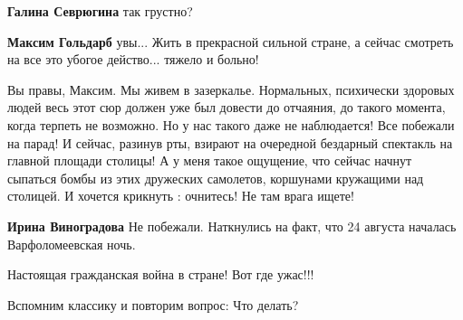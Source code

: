 \begin{itemize}
\begin{itemize}
\textbf{Галина Севрюгина} так грустно?

 
\textbf{Максим Гольдарб} увы... Жить в прекрасной сильной стране, а сейчас смотреть на все это убогое действо... тяжело и больно!
\end{itemize}

 

Вы правы, Максим. Мы живем в зазеркалье. Нормальных, психически здоровых людей
весь этот сюр должен уже был довести до отчаяния, до такого момента, когда
терпеть не возможно. Но у нас такого даже не наблюдается! Все побежали на
парад! И сейчас, разинув рты, взирают на очередной бездарный спектакль на
главной площади столицы! А у меня такое ощущение, что сейчас начнут сыпаться
бомбы из этих дружеских самолетов, коршунами кружащими над столицей. И хочется
крикнуть : очнитесь! Не там врага ищете!

\begin{itemize}
 
\textbf{Ирина Виноградова} Не побежали.
Наткнулись на факт, что 24 августа началась Варфоломеевская ночь.
\end{itemize}

 
Настоящая гражданская война в стране! Вот где ужас!!!

 
Вспомним классику и повторим вопрос: Что делать?


\end{itemize}
